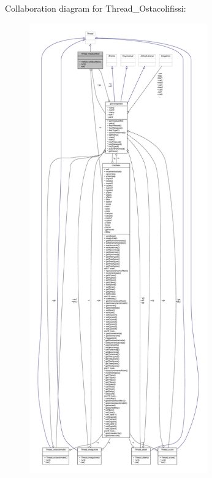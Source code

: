 Collaboration diagram for Thread\+\_\+\+Ostacolifissi\+:
\nopagebreak
\begin{figure}[H]
\begin{center}
\leavevmode
\includegraphics[height=550pt]{classcargame_1_1_thread___ostacolifissi__coll__graph}
\end{center}
\end{figure}
